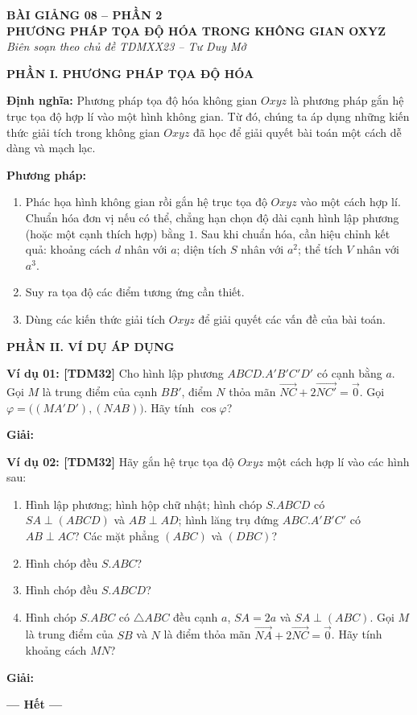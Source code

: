 \documentclass[12pt,a4paper]{article}
\newcommand{\partheading}[1]{\par\vspace{5pt}\noindent\textbf{\textcolor{sectionpurple}{#1}}\par\vspace{1pt}}
\newcommand{\example}[2][TDM32]{\noindent\textbf{\textcolor{sectionpurple}{Ví dụ #2:} \textcolor{noteborder}{[#1]}}\enspace}
\newcommand{\cvec}[1]{\overrightarrow{#1}}
\begin{document}
\fontsize{12}{14.6}\selectfont
\begin{center}
  \textbf{BÀI GIẢNG 08 -- PHẦN 2}\\[-1pt]
  \textbf{PHƯƠNG PHÁP TỌA ĐỘ HÓA TRONG KHÔNG GIAN OXYZ}\\[-2pt]
  {\fontsize{10.5}{12}\selectfont\itshape Biên soạn theo chủ đề TDMXX23 -- Tư Duy Mở}
\end{center}
\vspace{-7pt}

\partheading{PHẦN I. PHƯƠNG PHÁP TỌA ĐỘ HÓA}
\textbf{Định nghĩa:} Phương pháp tọa độ hóa không gian $Oxyz$ là phương pháp
gắn hệ trục tọa độ hợp lí vào một hình không gian. Từ đó, chúng ta áp dụng
những kiến thức giải tích trong không gian $Oxyz$ đã học để giải quyết
bài toán một cách dễ dàng và mạch lạc.

\textbf{Phương pháp:}
\begin{enumerate}[label=\textbf{Bước \arabic*:}]
  \item Phác họa hình không gian rồi gắn hệ trục tọa độ $Oxyz$ vào một
  cách hợp lí. Chuẩn hóa đơn vị nếu có thể, chẳng hạn chọn độ dài cạnh
  hình lập phương (hoặc một cạnh thích hợp) bằng $1$.
  Sau khi chuẩn hóa, cần hiệu chỉnh kết quả:
  khoảng cách $d$ nhân với $a$; diện tích $S$ nhân với $a^2$;
  thể tích $V$ nhân với $a^3$.
  \item Suy ra tọa độ các điểm tương ứng cần thiết.
  \item Dùng các kiến thức giải tích $Oxyz$ để giải quyết các vấn đề
  của bài toán.
\end{enumerate}

\partheading{PHẦN II. VÍ DỤ ÁP DỤNG}
\begin{notebox}
\example[TDM32]{01} Cho hình lập phương $ABCD.A'B'C'D'$ có cạnh bằng $a$.
Gọi $M$ là trung điểm của cạnh $BB'$, điểm $N$ thỏa mãn
$\cvec{NC}+2\cvec{NC'}=\vec{0}$.
Gọi $\varphi=\bigl((MA'D'),(NAB)\bigr)$.
Hãy tính $\cos\varphi$?
\end{notebox}
\textbf{\textcolor{sectionpurple}{Giải:}}

\begin{notebox}
\example[TDM32]{02} Hãy gắn hệ trục tọa độ $Oxyz$ một cách hợp lí vào
các hình sau:
\begin{enumerate}[label=\textbf{\arabic*.}]
  \item Hình lập phương; hình hộp chữ nhật; hình chóp $S.ABCD$
  có $SA\perp(ABCD)$ và $AB\perp AD$; hình lăng trụ đứng
  $ABC.A'B'C'$ có $AB\perp AC$? Các mặt phẳng $(ABC)$ và $(DBC)$?
  \item Hình chóp đều $S.ABC$?
  \item Hình chóp đều $S.ABCD$?
  \item Hình chóp $S.ABC$ có $\triangle ABC$ đều cạnh $a$,
  $SA=2a$ và $SA\perp(ABC)$. Gọi $M$ là trung điểm của $SB$
  và $N$ là điểm thỏa mãn $\cvec{NA}+2\cvec{NC}=\vec{0}$.
  Hãy tính khoảng cách $MN$?
\end{enumerate}
\end{notebox}
\textbf{\textcolor{sectionpurple}{Giải:}}

\begin{center}
\textbf{\textcolor{sectionpurple}{--- Hết ---}}
\end{center}
\end{document}
